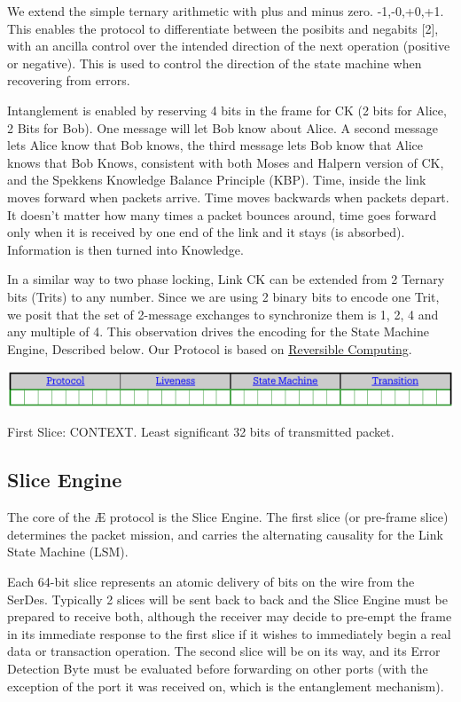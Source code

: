 \documentclass[../OAE-SPEC-MAIN.tex]{subfiles}
\begin{document}
We extend the simple ternary arithmetic with plus and minus zero. {-1,-0,+0,+1}. This enables the protocol to differentiate between the posibits and negabits [2], with an ancilla control over the intended direction of the next operation (positive or negative). This is used to control the direction of the state machine when recovering from errors.

Intanglement is enabled by reserving 4 bits in the frame for CK (2 bits for Alice, 2 Bits for Bob). One message will let Bob know about Alice.  A second message lets Alice know that Bob knows, the third message lets Bob know that Alice knows that Bob Knows, consistent with both Moses and Halpern version of CK, and the Spekkens Knowledge Balance Principle (KBP).
Time, inside the link moves forward when packets arrive. Time moves backwards when packets depart. It doesn’t matter how many times a packet bounces around, time goes forward only when it is received by one end of the link and it stays (is absorbed). Information is then turned into Knowledge. 

In a similar way to two phase locking, Link CK can be extended from 2 Ternary bits (Trits) to any number. Since we are using 2 binary bits to encode one Trit, we posit that the set of 2-message exchanges to synchronize them is 1, 2, 4 and any multiple of 4. This observation drives the encoding for the State Machine Engine, Described below.
Our Protocol is based on \href{https://wiki.xxiivv.com/site/reversible_computing.html}{Reversible Computing}. 

 \begin{marginfigure}
 \centering
  \includegraphics[width=1.1\linewidth]{./figures/First-Slice-Encodings.pdf}
\caption{\centering First Slice: CONTEXT. Least significant 32 bits of  transmitted packet.}
\end{marginfigure}

\subsection{Slice Engine}
The core of the Æ protocol is the Slice Engine. The first slice (or pre-frame slice) determines the packet mission, and carries the alternating causality for the Link State Machine (LSM).

Each 64-bit slice represents an atomic delivery of bits on the wire from the SerDes. Typically 2 slices will be sent back to back and the Slice Engine must be prepared to receive both, although the receiver may decide to pre-empt the frame in its immediate response to the first slice if it wishes to immediately begin a real data or transaction operation. The second slice will be on its way, and its Error Detection Byte must be evaluated before forwarding on other ports (with the exception of the port it was received on, which is the entanglement mechanism).
\end{document}
